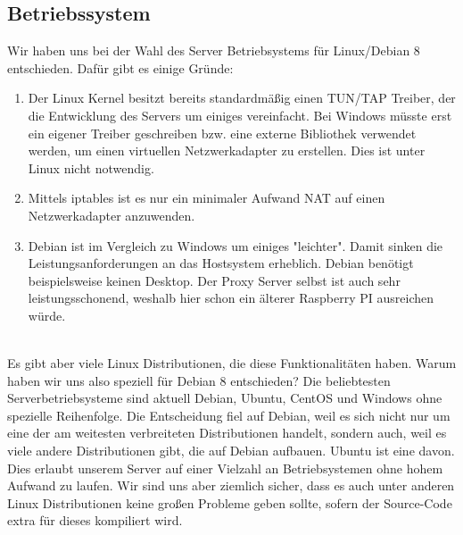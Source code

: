 \subsection{Betriebssystem}
Wir haben uns bei der Wahl des Server Betriebsystems für Linux/Debian 8 entschieden. Dafür gibt es einige Gründe:
\\
\begin{enumerate}
    \item Der Linux Kernel besitzt bereits standardmäßig einen TUN/TAP Treiber, der die Entwicklung des Servers um einiges vereinfacht. Bei Windows müsste erst ein eigener Treiber geschreiben bzw. eine externe Bibliothek verwendet werden, um einen virtuellen Netzwerkadapter zu erstellen. Dies ist unter Linux nicht notwendig.
    \item Mittels iptables ist es nur ein minimaler Aufwand NAT auf einen Netzwerkadapter anzuwenden. 
    \item Debian ist im Vergleich zu Windows um einiges "leichter". Damit sinken die Leistungsanforderungen an das Hostsystem erheblich. Debian benötigt beispielsweise keinen Desktop. Der Proxy Server selbst ist auch sehr leistungsschonend, weshalb hier schon ein älterer Raspberry PI ausreichen würde.
\end{enumerate}
\ \\
Es gibt aber viele Linux Distributionen, die diese Funktionalitäten haben. Warum haben wir uns also speziell für Debian 8 entschieden? Die beliebtesten Serverbetriebsysteme sind aktuell Debian, Ubuntu, CentOS und Windows ohne spezielle Reihenfolge. Die Entscheidung fiel auf Debian, weil es sich nicht nur um eine der am weitesten verbreiteten Distributionen handelt, sondern auch, weil es viele andere Distributionen gibt, die auf Debian aufbauen. Ubuntu ist eine davon. Dies erlaubt unserem Server auf einer Vielzahl an Betriebsystemen ohne hohem Aufwand zu laufen. Wir sind uns aber ziemlich sicher, dass es auch unter anderen Linux Distributionen keine großen Probleme geben sollte, sofern der Source-Code extra für dieses kompiliert wird.

